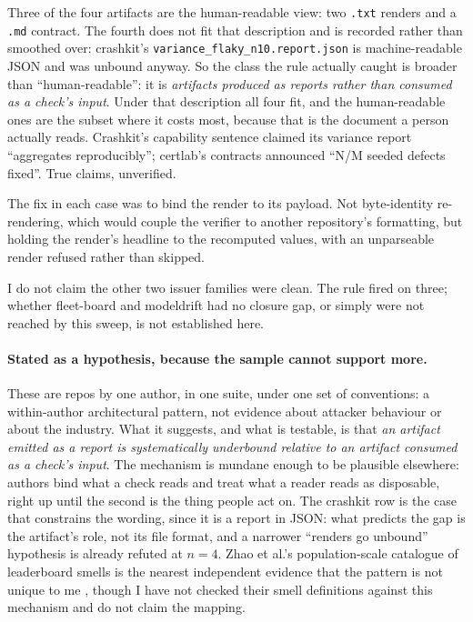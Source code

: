 \documentclass[11pt]{article}
\begin{document}
Three of the four artifacts are the human-readable view: two \texttt{.txt} renders and a
\texttt{.md} contract. The fourth does not fit that description and is recorded rather than
smoothed over: crashkit's \texttt{variance\_flaky\_n10.report.json} is machine-readable JSON
and was unbound anyway. So the class the rule actually caught is broader than
``human-readable'': it is \emph{artifacts produced as reports rather than consumed as a
check's input}. Under that description all four fit, and the human-readable ones are the
subset where it costs most, because that is the document a person actually reads. Crashkit's
capability sentence claimed its variance report ``aggregates reproducibly''; certlab's
contracts announced ``N/M seeded defects fixed''. True claims, unverified.

The fix in each case was to bind the render to its payload. Not byte-identity re-rendering,
which would couple the verifier to another repository's formatting, but holding the render's
headline to the recomputed values, with an unparseable render refused rather than skipped.

I do not claim the other two issuer families were clean. The rule fired on three; whether
fleet-board and modeldrift had no closure gap, or simply were not reached by this sweep, is
not established here.

\paragraph{Stated as a hypothesis, because the sample cannot support more.} These are repos
by one author, in one suite, under one set of conventions: a within-author architectural
pattern, not evidence about attacker behaviour or about the industry. What it suggests, and
what is testable, is that \emph{an artifact emitted as a report is systematically underbound
relative to an artifact consumed as a check's input}. The mechanism is mundane enough to be
plausible elsewhere: authors bind what a check reads and treat what a reader reads as
disposable, right up until the second is the thing people act on. The crashkit row is the
case that constrains the wording, since it is a report in JSON: what predicts the gap is the
artifact's role, not its file format, and a narrower ``renders go unbound'' hypothesis is
already refuted at $n=4$. Zhao et al.'s
population-scale catalogue of leaderboard smells is the nearest independent evidence that the
pattern is not unique to me \citep{zhao2025lbops}, though I have not checked their smell
definitions against this mechanism and do not claim the mapping.
\end{document}

